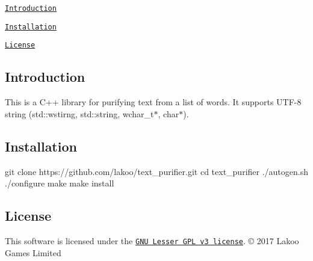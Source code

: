 
\begin{DoxyItemize}
\item \href{#introduction}{\tt Introduction}
\item \href{#installation}{\tt Installation}
\item \href{#license}{\tt License}
\end{DoxyItemize}

\subsection*{Introduction}

This is a C++ library for purifying text from a list of words. It supports U\+T\+F-\/8 string (std\+::wstirng, std\+::string, wchar\+\_\+t$\ast$, char$\ast$).

\subsection*{Installation}


\begin{DoxyCode}
git clone https://github.com/lakoo/text\_purifier.git
cd text\_purifier
./autogen.sh
./configure
make
make install
\end{DoxyCode}


\subsection*{License}

This software is licensed under the \href{https://www.gnu.org/copyleft/lgpl.html}{\tt G\+NU Lesser G\+PL v3 license}. © 2017 Lakoo Games Limited 